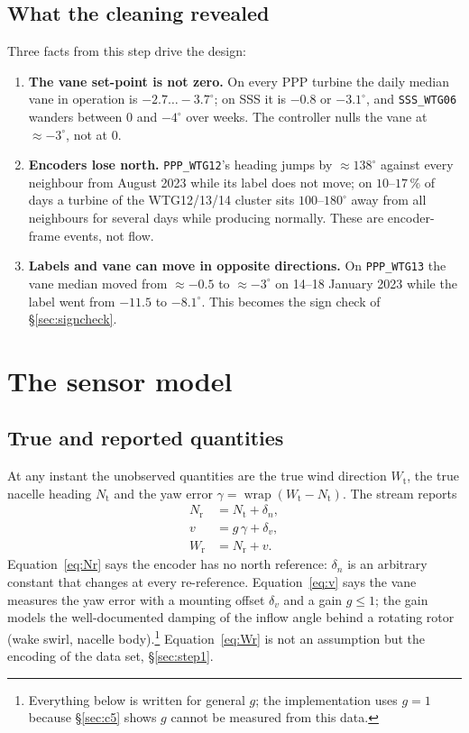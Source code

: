 \documentclass[11pt,a4paper]{article}
\theoremstyle{remark}
\newcommand{\wrap}{\operatorname{wrap}}
\newcommand{\dg}{^{\circ}}
\newcommand{\code}[1]{\texttt{#1}}
\newcommand{\Wt}{W_{\mathrm{t}}}
\newcommand{\Nt}{N_{\mathrm{t}}}
\newcommand{\Wr}{W_{\mathrm{r}}}
\newcommand{\Nr}{N_{\mathrm{r}}}
\begin{document}
\subsection{What the cleaning revealed}
Three facts from this step drive the design:
\begin{enumerate}
\item \textbf{The vane set-point is not zero.} On every PPP turbine the daily
      median vane in operation is $-2.7\ldots-3.7\dg$; on SSS it is $-0.8$ or
      $-3.1\dg$, and \code{SSS\_WTG06} wanders between $0$ and $-4\dg$ over
      weeks. The controller nulls the vane at $\approx-3\dg$, not at $0$.
\item \textbf{Encoders lose north.} \code{PPP\_WTG12}'s heading jumps by
      $\approx138\dg$ against every neighbour from August 2023 while its label does
      not move; on $10$--$17\,\%$ of days a turbine of the WTG12/13/14 cluster sits
      $100$--$180\dg$ away from all neighbours for several days while producing
      normally. These are encoder-frame events, not flow.
\item \textbf{Labels and vane can move in opposite directions.} On
      \code{PPP\_WTG13} the vane median moved from $\approx-0.5$ to $\approx-3\dg$
      on 14--18 January 2023 while the label went from $-11.5$ to $-8.1\dg$. This
      becomes the sign check of \S\ref{sec:signcheck}.
\end{enumerate}

\section{The sensor model}\label{sec:sensor}

\subsection{True and reported quantities}
At any instant the unobserved quantities are the true wind direction $\Wt$, the
true nacelle heading $\Nt$ and the yaw error $\gamma=\wrap(\Wt-\Nt)$. The stream
reports
\begin{align}
  \Nr &= \Nt + \delta_n, \label{eq:Nr}\\
  v   &= g\,\gamma + \delta_v, \label{eq:v}\\
  \Wr &= \Nr + v . \label{eq:Wr}
\end{align}
Equation~\eqref{eq:Nr} says the encoder has no north reference: $\delta_n$ is an
arbitrary constant that changes at every re-reference. Equation~\eqref{eq:v}
says the vane measures the yaw error with a mounting offset $\delta_v$ and a gain
$g\le1$; the gain models the well-documented damping of the inflow angle behind a
rotating rotor (wake swirl, nacelle body).\footnote{Everything below is written
for general $g$; the implementation uses $g=1$ because \S\ref{sec:c5} shows $g$
cannot be measured from this data.} Equation~\eqref{eq:Wr} is not an
assumption but the encoding of the data set, \S\ref{sec:step1}.
\end{document}
